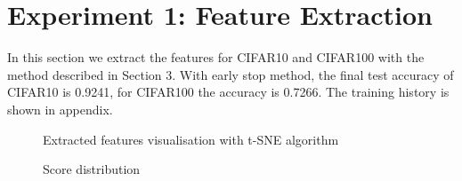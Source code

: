 \section{Experiment 1: Feature Extraction}
In this section we extract the features for CIFAR10 and CIFAR100 with the method described in Section 3. With early stop method, the final test accuracy of CIFAR10 is 0.9241, for CIFAR100 the accuracy is 0.7266. The training history is shown in appendix.

\begin{figure}[H]
\centering  
{}
\caption{Extracted features visualisation with t-SNE algorithm}
\label{Fig.tsne}
\end{figure}

\begin{figure}[H]
\centering  
{}
\caption{Score distribution}
\label{Fig.clscores}
\end{figure}

